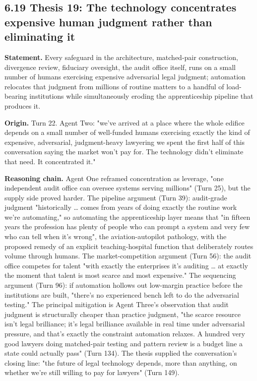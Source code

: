 \documentclass[sigconf,nonacm=true]{acmart}
\begin{document}
\subsection{6.19 Thesis 19: The technology concentrates expensive human judgment rather than eliminating it}

\textbf{Statement.} Every safeguard in the architecture,  matched-pair construction, divergence review, fiduciary oversight, the audit office itself,  runs on a small number of humans exercising expensive adversarial legal judgment; automation relocates that judgment from millions of routine matters to a handful of load-bearing institutions while simultaneously eroding the apprenticeship pipeline that produces it.

\textbf{Origin.} Turn 22. Agent Two: "we've arrived at a place where the whole edifice depends on a small number of well-funded humans exercising exactly the kind of expensive, adversarial, judgment-heavy lawyering we spent the first half of this conversation saying the market won't pay for. The technology didn't eliminate that need. It concentrated it."

\textbf{Reasoning chain.} Agent One reframed concentration as leverage,  "one independent audit office can oversee systems serving millions" (Turn 25),  but the supply side proved harder. The pipeline argument (Turn 39): audit-grade judgment "historically … comes from years of doing exactly the routine work we're automating," so automating the apprenticeship layer means that "in fifteen years the profession has plenty of people who can prompt a system and very few who can tell when it's wrong",  the aviation-autopilot pathology, with the proposed remedy of an explicit teaching-hospital function that deliberately routes volume through humans. The market-competition argument (Turn 56): the audit office competes for talent "with exactly the enterprises it's auditing … at exactly the moment that talent is most scarce and most expensive." The sequencing argument (Turn 96): if automation hollows out low-margin practice before the institutions are built, "there's no experienced bench left to do the adversarial testing." The principal mitigation is Agent Three's observation that audit judgment is structurally cheaper than practice judgment,  "the scarce resource isn't legal brilliance; it's legal brilliance available in real time under adversarial pressure, and that's exactly the constraint automation relaxes. A hundred very good lawyers doing matched-pair testing and pattern review is a budget line a state could actually pass" (Turn 134). The thesis supplied the conversation's closing line: "the future of legal technology depends, more than anything, on whether we're still willing to pay for lawyers" (Turn 149).
\end{document}
